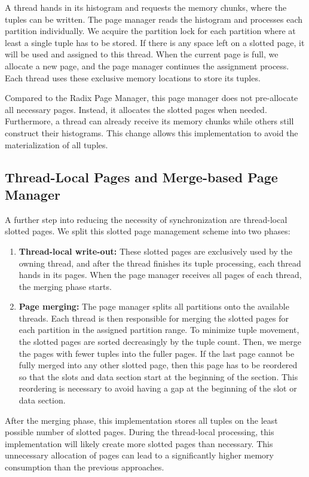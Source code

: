 A thread hands in its histogram and requests the memory chunks, where the tuples can be written.
The page manager reads the histogram and processes each partition individually.
We acquire the partition lock for each partition where at least a single tuple has to be stored.
If there is any space left on a slotted page, it will be used and assigned to this thread.
When the current page is full, we allocate a new page, and the page manager continues the assignment process.
Each thread uses these exclusive memory locations to store its tuples.

Compared to the Radix Page Manager, this page manager does not pre-allocate all necessary pages.
Instead, it allocates the slotted pages when needed.
Furthermore, a thread can already receive its memory chunks while others still construct their histograms.
This change allows this implementation to avoid the materialization of all tuples.
\subsection{Thread-Local Pages and Merge-based Page Manager}\label{subsection-Thread-Local-Pages-Page-Manager}
A further step into reducing the necessity of synchronization are thread-local slotted pages.
We split this slotted page management scheme into two phases:
\begin{enumerate}
  \item \textbf{Thread-local write-out:}
        These slotted pages are exclusively used by the owning thread, and after the thread finishes its tuple processing, each thread hands in its pages.
        When the page manager receives all pages of each thread, the merging phase starts.

  \item \textbf{Page merging:}
        The page manager splits all partitions onto the available threads.
        Each thread is then responsible for merging the slotted pages for each partition in the assigned partition range.
        To minimize tuple movement, the slotted pages are sorted decreasingly by the tuple count.
        Then, we merge the pages with fewer tuples into the fuller pages.
        If the last page cannot be fully merged into any other slotted page, then this page has to be reordered so that the slots and data section start at the beginning of the section.
        This reordering is necessary to avoid having a gap at the beginning of the slot or data section.
\end{enumerate}
After the merging phase, this implementation stores all tuples on the least possible number of slotted pages.
During the thread-local processing, this implementation will likely create more slotted pages than necessary.
This unnecessary allocation of pages can lead to a significantly higher memory consumption than the previous approaches.
